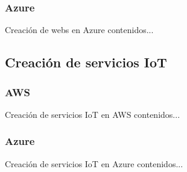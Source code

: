 \documentclass[aspectratio=1610]{beamer}
\begin{document}
\subsubsection{Azure}
\begin{frame}{Creación de webs en Azure}
	contenidos...
\end{frame}

\subsection{Creación de servicios IoT}
\subsubsection{AWS}
\begin{frame}{Creación de servicios IoT en AWS}
	contenidos...
\end{frame}

\subsubsection{Azure}
\begin{frame}{Creación de servicios IoT en Azure}
	contenidos...
\end{frame}
\end{document}
